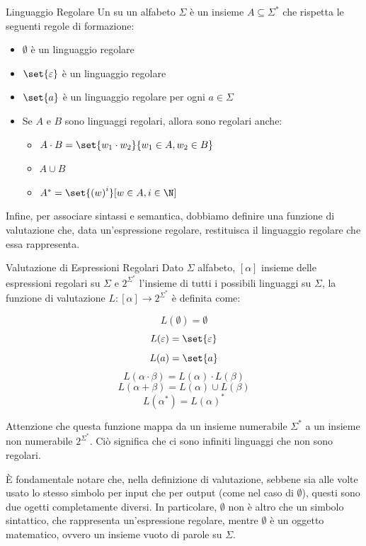 \begin{definition}{Linguaggio Regolare}
  Un  su un alfabeto \(\Sigma\) è un insieme \(A \subseteq \Sigma^*\) che rispetta le seguenti regole di formazione:
  \begin{itemize}
    \item \(\emptyset\) è un linguaggio regolare
    \item \(\set{\varepsilon}\) è un linguaggio regolare
    \item \(\set{a}\) è un linguaggio regolare per ogni \(a \in \Sigma\)
    \item Se \(A\) e \(B\) sono linguaggi regolari, allora sono regolari anche:
          \begin{itemize}
            \item \(A \cdot B = \set{w_1 \cdot w_2}{w_1 \in A, w_2 \in B}\)
            \item \(A \cup B\)
            \item \(A^* = \set{{(w)}^i}[w \in A, i \in \N]\)
          \end{itemize}
  \end{itemize}
\end{definition}

Infine, per associare sintassi e semantica, dobbiamo definire una funzione di valutazione che, data un'espressione regolare, restituisca il linguaggio regolare che essa rappresenta.

\begin{definition}{Valutazione di Espressioni Regolari}
  Dato \(\Sigma\) alfabeto, \([\alpha]\) insieme delle espressioni regolari su \(\Sigma\) e \(2^{\Sigma^*}\) l'insieme di tutti i possibili linguaggi su \(\Sigma\), la funzione di valutazione \(L : [\alpha] \to 2^{\Sigma^*}\) è definita come:

  \[L(\emptyset) = \emptyset\]
  \[L(\varepsilon) = \set{\varepsilon}\]
  \[L(a) = \set{a}\]
  \[L(\alpha \cdot \beta) = L(\alpha) \cdot L(\beta)\]
  \[L(\alpha + \beta) = L(\alpha) \cup L(\beta)\]
  \[L(\alpha^*) = {L(\alpha)}^*\]
\end{definition}


\begin{note}{}
  Attenzione che questa funzione mappa da un insieme numerabile \(\Sigma^*\) a un insieme non numerabile \(2^{\Sigma^*}\). Ciò significa che ci sono infiniti linguaggi che non sono regolari.
\end{note}

\begin{note}{}
  È fondamentale notare che, nella definizione di valutazione, sebbene sia alle volte usato lo stesso simbolo per input che per output (come nel caso di \(\emptyset\)), questi sono due ogetti completamente diversi. In particolare,  \(\emptyset\) non è altro che un simbolo sintattico, che rappresenta un'espressione regolare, mentre  \(\emptyset\) è un oggetto matematico, ovvero un insieme vuoto di parole su \(\Sigma\).
\end{note}


